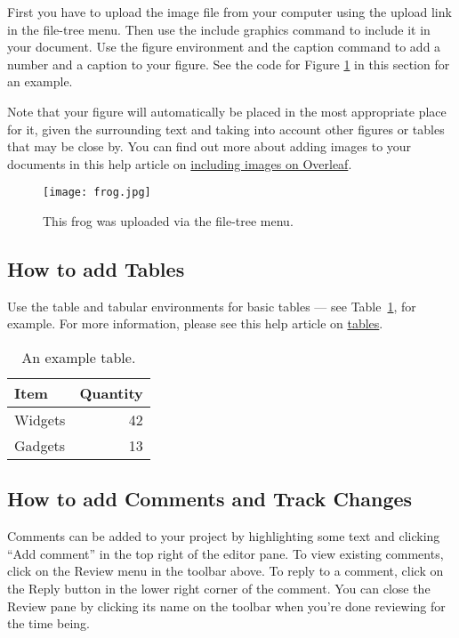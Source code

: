 \documentclass[12pt,a4paper]{article}
\begin{document}
First you have to upload the image file from your computer using the upload link in the file-tree menu. Then use the include graphics command to include it in your document. Use the figure environment and the caption command to add a number and a caption to your figure. See the code for Figure \ref{fig:frog} in this section for an example.

Note that your figure will automatically be placed in the most appropriate place for it, given the surrounding text and taking into account other figures or tables that may be close by. You can find out more about adding images to your documents in this help article on \href{https://www.overleaf.com/learn/how-to/Including_images_on_Overleaf}{including images on Overleaf}.

\begin{figure}
\centering
\texttt{[image: frog.jpg]}
\caption{\label{fig:frog}This frog was uploaded via the file-tree menu.}
\end{figure}

\subsection{How to add Tables}

Use the table and tabular environments for basic tables --- see Table~\ref{tab:widgets}, for example. For more information, please see this help article on \href{https://www.overleaf.com/learn/latex/tables}{tables}. 

\begin{table}
\centering
\begin{tabular}{l|r}
Item & Quantity \\\hline
Widgets & 42 \\
Gadgets & 13
\end{tabular}
\caption{\label{tab:widgets}An example table.}
\end{table}

\subsection{How to add Comments and Track Changes}

Comments can be added to your project by highlighting some text and clicking ``Add comment'' in the top right of the editor pane. To view existing comments, click on the Review menu in the toolbar above. To reply to a comment, click on the Reply button in the lower right corner of the comment. You can close the Review pane by clicking its name on the toolbar when you're done reviewing for the time being.
\end{document}
